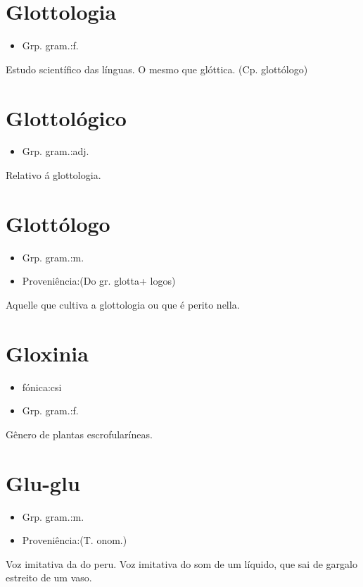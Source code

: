\section{Glottologia}
\begin{itemize}
\item {Grp. gram.:f.}
\end{itemize}
Estudo scientífico das línguas.
O mesmo que \textunderscore glóttica\textunderscore .
(Cp. \textunderscore glottólogo\textunderscore )
\section{Glottológico}
\begin{itemize}
\item {Grp. gram.:adj.}
\end{itemize}
Relativo á glottologia.
\section{Glottólogo}
\begin{itemize}
\item {Grp. gram.:m.}
\end{itemize}
\begin{itemize}
\item {Proveniência:(Do gr. \textunderscore glotta\textunderscore  + \textunderscore logos\textunderscore )}
\end{itemize}
Aquelle que cultiva a glottologia ou que é perito nella.
\section{Gloxinia}
\begin{itemize}
\item {fónica:csi}
\end{itemize}
\begin{itemize}
\item {Grp. gram.:f.}
\end{itemize}
Gênero de plantas escrofularíneas.
\section{Glu-glu}
\begin{itemize}
\item {Grp. gram.:m.}
\end{itemize}
\begin{itemize}
\item {Proveniência:(T. onom.)}
\end{itemize}
Voz imitativa da do peru.
Voz imitativa do som de um líquido, que sai de gargalo estreito de um vaso.
